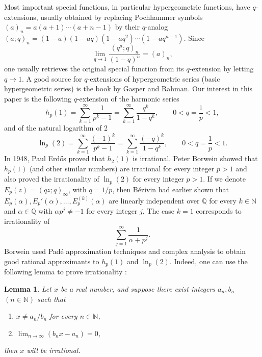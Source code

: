 \documentclass[12pt]{article}
\newtheorem{lemma}{Lemma}
\begin{document}
Most important special functions, in particular hypergeometric functions,
have $q$-ex\-ten\-sions, usually obtained by replacing Pochhammer symbols
$(a)_n = a(a+1)\cdots(a+n-1)$ by their $q$-analog
$(a;q)_n = (1-a)(1-aq)(1-aq^2)\cdots(1-aq^{n-1})$. Since
\[   \lim_{q \to 1} \frac{(q^a;q)_n}{(1-q)^n} = (a)_n,  \]
one usually retrieves the original special function from its
$q$-extension by letting $q \to 1$. A good source for
$q$-extensions of hypergeometric series (basic hypergeometric
series) is the book \cite{GR} by Gasper and Rahman. Our interest
in this paper is the following $q$-extension of the harmonic series
\begin{equation}  \label{eq:hp1}
  h_p(1) = \sum_{k=1}^\infty \frac{1}{p^k-1} 
        = \sum_{k=1}^\infty \frac{q^k}{1-q^k}, 
        \qquad 0 < q = \frac1p < 1, 
\end{equation}
 and of the natural logarithm of 2
\begin{equation}  \label{eq:logp2}
    \ln_p(2) = \sum_{k=1}^\infty  \frac{(-1)^k}{p^k-1} 
             = \sum_{k=1}^\infty \frac{(-q)^k}{1-q^k},
               \qquad 0 < q = \frac1p < 1.
\end{equation}               
In 1948, Paul Erd\H{o}s \cite{erdos} proved that $h_2(1)$ is irrational.
Peter Borwein \cite{bor1} \cite{bor2} showed that $h_p(1)$ 
(and other similar numbers) are
irrational for every integer $p >1$ and also proved the
irrationality of $\ln_p(2)$ for every integer $p > 1$. If we denote 
$E_p(z) = (qz;q)_\infty$, with $q=1/p$, then
B\'ezivin \cite{Be} had earlier shown that $E_p(\alpha), E_p'(\alpha), \ldots, E_p^{(k)}(\alpha)$ are linearly independent over $\mathbb{Q}$
for every $k \in \mathbb{N}$ and $\alpha \in \mathbb{Q}$ with $\alpha p^j
\neq -1$ for every integer $j$. The case $k=1$ corresponds to irrationality
of
\[   \sum_{j=1}^\infty \frac{1}{\alpha+p^j}. \]
Borwein used
Pad\'e approximation techniques and complex analysis to obtain good rational
approximants to $h_p(1)$ and $\ln_p(2)$. Indeed, one can use the following lemma
to prove irrationality \cite[Lemma 5.1]{wva}:
\begin{lemma} \label{lem1}
Let $x$ be a
real number, and suppose there exist integers $a_n, b_n$ 
$(n \in \mathbb{N})$ such that
\begin{enumerate}
 \item $x\neq a_n/b_n$ for every $n \in \mathbb{N}$,
 \item $\lim_{n \to \infty} ( b_n x-a_n) = 0$,
\end{enumerate}
then $x$ will be irrational.
\end{lemma}
\end{document}
